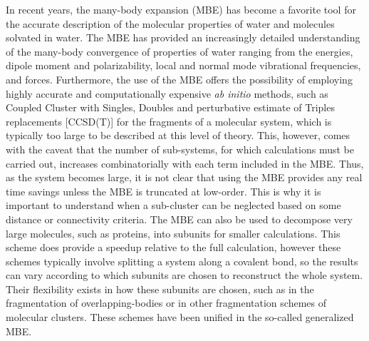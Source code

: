 \documentclass [11pt, proquest] {uwthesis}[2020/02/24]
\begin{document}
\par In recent years, the many-body expansion (MBE) has become a favorite tool for the accurate description of the molecular properties of water and molecules solvated in water. The MBE has provided an increasingly detailed understanding of the many-body convergence of properties of water ranging from the energies\autocite{xantheas_ab_1994, pedulla_theoretical_1998}, dipole moment and polarizability\autocite{medders_many-body_2013}, local and normal mode vibrational frequencies\autocite{heindel_origin_2018, howard_n-body_2013}, and forces\autocite{bates_efficient_2011, demerdash_convergence_2016, demerdash_assessing_2017}. Furthermore, the use of the MBE offers the possibility of employing highly accurate and computationally expensive \textit{ab initio} methods, such as Coupled Cluster with Singles, Doubles and perturbative estimate of Triples replacements [CCSD(T)] for the fragments of a molecular system, which is typically too large to be described at this level of theory. This, however, comes with the caveat that the number of sub-systems, for which calculations must be carried out, increases combinatorially with each term included in the MBE. Thus, as the system becomes large, it is not clear that using the MBE provides any real time savings unless the MBE is truncated at low-order. This is why it is important to understand when a sub-cluster can be neglected based on some distance or connectivity criteria.\autocite{cui_theoretical_2006, ouyang_when_2016} The MBE can also be used to decompose very large molecules, such as proteins, into subunits for smaller calculations.\autocite{mayhall_many-overlapping-body_2012, richard_many-body_2013} This scheme does provide a speedup relative to the full calculation, however these schemes typically involve splitting a system along a covalent bond, so the results can vary according to which subunits are chosen to reconstruct the whole system. Their flexibility exists in how these subunits are chosen, such as in the fragmentation of overlapping-bodies or in other fragmentation schemes of molecular clusters. These schemes have been unified in the so-called generalized MBE.\autocite{richard_generalized_2012}
\end{document}
